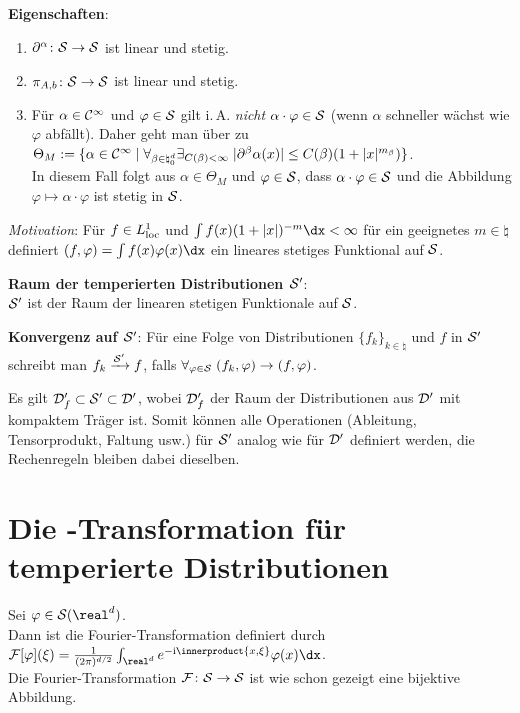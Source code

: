 \textbf{Eigenschaften}:
\begin{enumerate}
    \item
    $\partial^\alpha\colon \S \rightarrow \S$ ist linear und stetig.

    \item
    $\pi_{A,b}\colon \S \rightarrow \S$ ist linear und stetig.

    \item
    Für $\alpha \in \C^\infty$ und $\varphi \in \S$ gilt i.\,A. \emph{nicht}
    $\alpha \cdot \varphi \in \S$
    (wenn $\alpha$ schneller wächst wie $\varphi$ abfällt).
    Daher geht man über zu $\Theta_M := \{\alpha \in \C^\infty \;|\;
    \forall_{\beta \in \natural_0^d} \exists_{C(\beta) < \infty}\;
    |\partial^\beta \alpha(x)| \le C(\beta) (1 + |x|^{m_\beta})\}$.\\
    In diesem Fall folgt aus $\alpha \in \Theta_M$ und $\varphi \in \S$,
    dass $\alpha \cdot \varphi \in \S$ und die Abbildung
    $\varphi \mapsto \alpha \cdot \varphi$ ist stetig in $\S$.
\end{enumerate}

\linie

\emph{Motivation}:
Für $f \in L^1_\loc$ und $\int f(x) (1 + |x|)^{-m} \dx < \infty$ für ein
geeignetes $m \in \natural$ definiert
$(f, \varphi) = \int f(x) \varphi(x)\dx$ ein lineares stetiges Funktional auf
$\S$.

\textbf{Raum der temperierten Distributionen $\S'$}:\\
$\S'$ ist der Raum der linearen stetigen Funktionale auf $\S$.

\textbf{Konvergenz auf $\S'$}:
Für eine Folge von Distributionen $\{f_k\}_{k \in \natural}$ und
$f$ in $\S'$ schreibt man $f_k \xrightarrow{\S'} f$, falls
$\forall_{\varphi \in \S}\; (f_k, \varphi) \to (f, \varphi)$.

Es gilt $\D_f' \subset \S' \subset \D'$, wobei
$\D_f'$ der Raum der Distributionen aus $\D'$ mit kompaktem Träger ist.
Somit können alle Operationen
(Ableitung, Tensorprodukt, Faltung usw.)
für $\S'$ analog wie für $\D'$ definiert werden,
die Rechenregeln bleiben dabei dieselben.

\pagebreak

\section{%
    Die -Transformation für temperierte Distributionen%
}

Sei $\varphi \in \S(\real^d)$.\\
Dann ist die Fourier-Transformation definiert durch
$\F[\varphi](\xi) = \frac{1}{(2\pi)^{d/2}}
\int_{\real^d} e^{-\i\innerproduct{x, \xi}}\varphi(x)\dx$.\\
Die Fourier-Transformation $\F\colon \S \rightarrow \S$ ist wie schon gezeigt
eine bijektive Abbildung.

